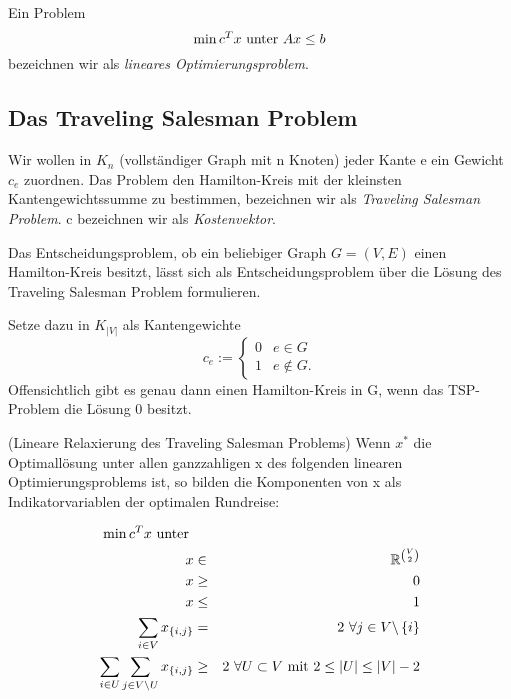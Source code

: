 \documentclass[10pt]{scrbook}
\begin{document}
\begin{Def}
Ein Problem
\begin{displaymath}
	\min c^T x \textnormal{ unter } A x\leq b
\end{displaymath}
bezeichnen wir als \emph{lineares Optimierungsproblem}.
\end{Def}

\subsection{Das Traveling Salesman Problem}

\begin{Def}
Wir wollen in $K_n$ (vollständiger Graph mit n Knoten) jeder Kante e ein Gewicht $c_e$ zuordnen. Das Problem den Hamilton-Kreis mit der kleinsten Kantengewichtssumme zu bestimmen, bezeichnen wir als \emph{Traveling Salesman Problem}. c bezeichnen wir als \emph{Kostenvektor}.
\end{Def}

\begin{Bem}
Das Entscheidungsproblem, ob ein beliebiger Graph $G=(V, E)$ einen Hamilton-Kreis besitzt, lässt sich als Entscheidungsproblem über die Lösung des Traveling Salesman Problem formulieren.

Setze dazu in $K_{\left|V\right|}$ als Kantengewichte
\begin{displaymath}
c_e:=\begin{cases}
0 & e\in G\\
1 & e\notin G.
\end{cases}
\end{displaymath}
Offensichtlich gibt es genau dann einen Hamilton-Kreis in G, wenn das TSP-Problem die Lösung 0 besitzt.

\end{Bem}

\begin{Sa}
(Lineare Relaxierung des Traveling Salesman Problems) Wenn $x^*$ die Optimallösung unter allen ganzzahligen x des folgenden linearen Optimierungsproblems ist, so bilden die Komponenten von x als Indikatorvariablen der optimalen Rundreise:

\begin{eqnarray}
\min c^T x\textnormal{ unter } & & \nonumber\\
x & \in & \mathbb{R}^{V \choose 2}\\
x & \geq & 0 \\
x & \leq & 1 \\
\sum_{i\in V} x_{\left\{i, j\right\}} & = & 2\ \forall j\in V\backslash \left\{i\right\} \label{eq:kreise} \\
\sum_{i\in U} \sum_{j\in V\backslash U} x_{\left\{i, j\right\}} & \geq & 2\ \forall U\subset V\textnormal{ mit }2\leq\left|U\right|\leq \left|V\right|-2 \label{eq:subtour_elimination}
\end{eqnarray}
\end{Sa}
\end{document}
